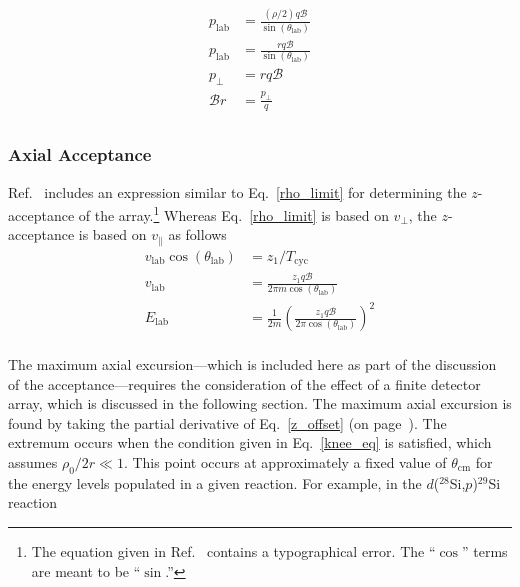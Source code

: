 \begin{equation}
\begin{split}
p_\mathrm{lab}&=\frac{(\rho/2)q\mathscr{B}}{\sin(\theta_\mathrm{lab})}\\
p_\mathrm{lab}&=\frac{rq\mathscr{B}}{\sin(\theta_\mathrm{lab})}\\
p_\perp&=rq\mathscr{B}\\
\mathscr{B}r&=\frac{p_\perp}{q}\\
\end{split}
\label{B-rho}
\end{equation}

\subsubsection{Axial Acceptance}
Ref.~\cite{Wuosmaa_2007} includes an expression similar to Eq.~\ref{rho_limit} for determining the $z$-acceptance of the array.\footnote{The equation given in Ref.~\cite[Eq.~11]{Wuosmaa_2007} contains a typographical error.  The ``$\cos$'' terms are meant to be ``$\sin$.''}  Whereas Eq.~\ref{rho_limit} is based on $v_\perp$, the $z$-acceptance is based on $v_\parallel$ as follows
\begin{equation}
\begin{split}
v_\mathrm{lab}\cos(\theta_\mathrm{lab})%
&=z_1/T_\mathrm{cyc}\\
v_\mathrm{lab}&=\frac{z_1q\mathscr{B}}{2\pi m \cos(\theta_\mathrm{lab})}\\
E_\mathrm{lab}&=\frac{1}{2m}\left(\frac{z_1q\mathscr{B}}{2\pi \cos(\theta_\mathrm{lab})}\right)^2\\
\end{split}
\end{equation}
\par The maximum axial excursion---which is included here as part of the discussion of the ac\-cep\-tance---re\-quires the consideration of the effect of a finite detector array, which is discussed in the following section.   The maximum axial excursion is found by taking the partial derivative of Eq.~\ref{z_offset} (on page~\pageref{z_offset}).  The extremum occurs when the condition given in Eq.~\ref{knee_eq} is satisfied, which assumes $\rho_0/2r\ll 1$.  This point occurs at approximately a fixed value of $\theta_\mathrm{cm}$ for the energy levels populated in a given reaction.  For example, in the $d$($^{28}$Si,$p$)$^{29}$Si reaction %
